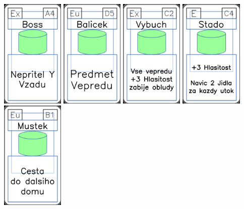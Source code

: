\documentclass[a4paper]{article}
\begin{document}
	\includegraphics[width=3.0cm]{img-4_3}
	\includegraphics[width=3.0cm]{img-4_19}
	\includegraphics[width=3.0cm]{img-4_11}
	\includegraphics[width=3.0cm]{img-4_43}
	\includegraphics[width=3.0cm]{img-4_35}
\end{document}
